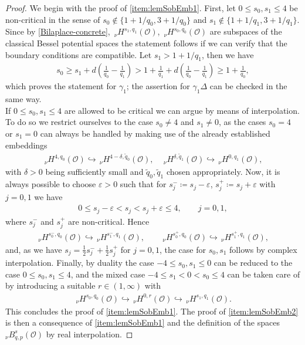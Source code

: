 \documentclass[reqno]{amsart}
\newcommand{\sO}{\mathscr{O}}
\newcommand{\1}{\mathbf{1}}
\newcommand{\nH}{\ensuremath{\,_\nu H}}
\newcommand{\bpsn}[1]{\ensuremath{\nH^{#1}(\sO)}}
\begin{document}
\begin{proof}
We begin with the proof of \ref{item:lemSobEmb1}. First, let $0\leq s_0,s_1\leq 4$ be non-critical in the sense of $s_0 \notin \{1+1/q_0, 3+1/q_0 \}$ and $s_1 \notin \{1+1/q_1, 3+1/q_1 \}$. Since by \eqref{Bilaplace-concrete},  $  \bpsn{s_1,q_1}$, $  \bpsn{s_0,q_0}$ are subspaces of the classical Bessel potential spaces the statement follows if we can verify that the boundary conditions are compatible. Let $s_1>1+1/q_1$, then we have
\begin{align*}
s_0
\geq
s_1+d\left(\frac{1}{q_0}-\frac{1}{q_1}\right)
>
1+\frac{1}{q_1}
+d\left(\frac{1}{q_0}-\frac{1}{q_1}\right)
\geq
1+\frac{1}{q_0},
\end{align*}
which proves the statement for $\gamma_1$; the assertion for $\gamma_1\Delta$ can be checked in the same way.\\
If $0\leq s_0,s_1\leq 4$ are allowed to be critical we can argue by means of interpolation. To do so we restrict ourselves to the case $s_0\neq 4$ and $s_1\neq 0$, as the cases $s_0=4$ or $s_1=0$ can always be handled by making use of the already established embeddings
\begin{align*}
    \bpsn{4,q_0} \hookrightarrow \bpsn{4-\delta,\tilde{q}_0}, \quad \bpsn{\delta,\tilde{q}_1} \hookrightarrow \bpsn{0,q_1},
\end{align*}
with $\delta>0$ being sufficiently small and $\tilde{q}_0,\tilde{q}_1$ chosen appropriately. Now, it is always possible to choose $\varepsilon>0$ such that for 
$s_j^- \coloneq s_j-\varepsilon$, $ 
s_j^+ \coloneq s_j+\varepsilon$ with $j=0,1$ we have
\begin{align*}
0\leq s_j-\varepsilon<s_j<s_j+\varepsilon\leq 4,
\qquad j=0,1,
\end{align*}
where $s_j^-$ and $s_j^+$ are non-critical. Hence
\begin{align*}
\bpsn{s_0^-,q_0}
\hookrightarrow
\bpsn{s_1^-,q_1},
\qquad
\bpsn{s_0^+,q_0}
\hookrightarrow
\bpsn{s_1^+,q_1},
\end{align*}
and, as we have $ 
s_j=\frac12 s_j^-+\frac12 s_j^+$ for $ j=0,1$, 
the case for $s_0,s_1$ follows by complex interpolation. Finally, by duality the case $-4\leq s_0,s_1\leq 0$ can be reduced to the case $0\leq s_0,s_1\leq 4$, and the mixed case $-4\leq s_1<0<s_0\leq 4$ can be taken care of by introducing a suitable $r\in (1,\infty)$ with 
\begin{align*}
    \bpsn{s_0,q_0}
\hookrightarrow
\bpsn{0,r}
\hookrightarrow
\bpsn{s_1,q_1}.
\end{align*}
This concludes the proof of \ref{item:lemSobEmb1}. The proof of \ref{item:lemSobEmb2} is then a consequence of \ref{item:lemSobEmb1} and the definition of the spaces   ${_\nu B^{ s}_{q,p}(\sO)}$  by real interpolation. 
\end{proof}
\end{document}
